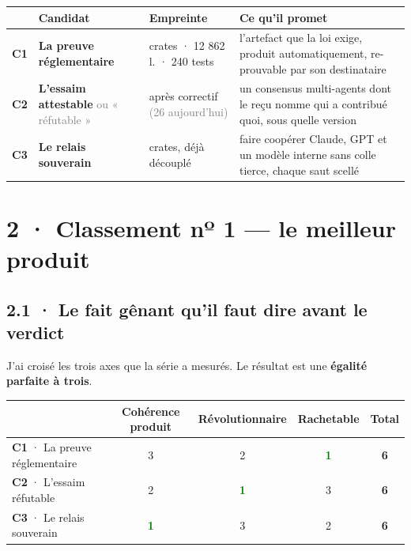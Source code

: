 \documentclass[10pt]{article}
\newcommand{\best}[1]{\textcolor{green}{\textbf{#1}}}
\newcommand{\sz}[1]{\textcolor{grey}{\small\textsf{#1}}}
\begin{document}
\renewcommand{\arraystretch}{1.2}
\begin{center}\small
\begin{tabular}{@{}c >{\raggedright\arraybackslash}p{4.1cm} >{\raggedright\arraybackslash}p{3.5cm} >{\raggedright\arraybackslash}p{7.0cm}@{}}
\toprule
& \textbf{Candidat} & \textbf{Empreinte} & \textbf{Ce qu'il promet} \\
\midrule
\textbf{C1} & \textbf{La preuve réglementaire} & 8 crates · 12 862 l. · 240 tests & l'artefact que la loi exige, produit automatiquement, re-prouvable par son destinataire \\
\textbf{C2} & \textbf{L'essaim attestable} \sz{ou « réfutable »} & 9 après correctif \sz{(26 aujourd'hui)} & un consensus multi-agents dont le reçu nomme qui a contribué quoi, sous quelle version \\
\textbf{C3} & \textbf{Le relais souverain} & 11 crates, déjà découplé & faire coopérer Claude, GPT et un modèle interne sans colle tierce, chaque saut scellé \\
\bottomrule
\end{tabular}
\end{center}

\section{2 · Classement nº 1 --- le meilleur produit}

\subsection{2.1 · Le fait gênant qu'il faut dire avant le verdict}

J'ai croisé les trois axes que la série a mesurés. Le résultat est une \textbf{égalité parfaite à
trois}.

\renewcommand{\arraystretch}{1.2}
\begin{center}\small
\begin{tabular}{@{}>{\raggedright\arraybackslash}p{6.2cm} ccc c@{}}
\toprule
& \textbf{Cohérence produit} & \textbf{Révolutionnaire} & \textbf{Rachetable} & \textbf{Total} \\
\midrule
\textbf{C1} · La preuve réglementaire & 3 & 2 & \best{1} & \textbf{6} \\
\textbf{C2} · L'essaim réfutable & 2 & \best{1} & 3 & \textbf{6} \\
\textbf{C3} · Le relais souverain & \best{1} & 3 & 2 & \textbf{6} \\
\bottomrule
\end{tabular}
\end{center}
\end{document}
